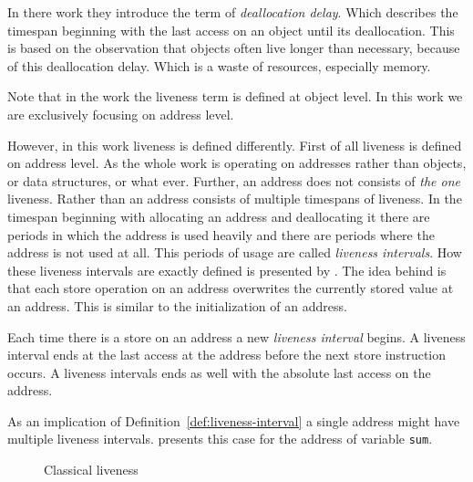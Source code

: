\documentclass[onecolumn, openright, master, english, signatures]{dbrgrptt}
\begin{document}
In there work they introduce the term of \emph{deallocation delay}. Which describes the timespan beginning with the last access on an object until its deallocation. This is based on the observation that objects often live longer than necessary, because of this deallocation delay. Which is a waste of resources, especially memory.

\begin{remark}
Note that in the work \cite{aigner2013acdc} the liveness term is defined at object level. In this work we are exclusively focusing on address level.
\end{remark}

However, in this work liveness is defined differently. First of all liveness is defined on address level. As the whole work is operating on addresses rather than objects, or data structures, or what ever. Further, an address does not consists of \emph{the one} liveness. Rather than an address consists of multiple timespans of liveness. In the timespan beginning with allocating an address and deallocating it there are periods in which the address is used heavily and there are periods where the address is not used at all. This periods of usage are called \emph{liveness intervals}. How these liveness intervals are exactly defined is presented by . The idea behind is that each store operation on an address overwrites the currently stored value at an address. This is similar to the initialization of an address.

\begin{definition}\label{def:liveness-interval}
Each time there is a store on an address a new \emph{liveness interval} begins. A liveness interval ends at the last access at the address before the next store instruction occurs. A liveness intervals ends as well with the absolute last access on the address.
\end{definition}

\begin{remark}
As an implication of Definition~\ref{def:liveness-interval} a single address might have multiple liveness intervals.  presents this case for the address of variable \texttt{sum}.
\end{remark}

\begin{figure}[!ht]
  \centering
  
  \caption{Classical liveness}
  \label{fig:liveness-classical}
\end{figure}
\end{document}
